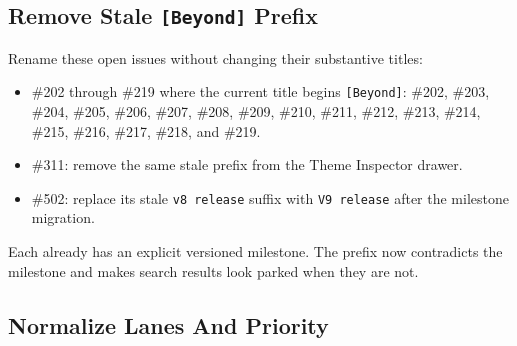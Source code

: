 \subsection{\texorpdfstring{Remove Stale \texttt{[\allowbreak{}B\allowbreak{}e\allowbreak{}y\allowbreak{}o\allowbreak{}n\allowbreak{}d\allowbreak{}]} Prefix}{Remove Stale  Prefix}}\label{record-249-remove-stale-beyond-prefix}

Rename these open issues without changing their substantive titles:

\begin{itemize}
\tightlist
\item
  \#202 through \#219 where the current title begins \texttt{[\allowbreak{}B\allowbreak{}e\allowbreak{}y\allowbreak{}o\allowbreak{}n\allowbreak{}d\allowbreak{}]}: \#202, \#203, \#204, \#205, \#206, \#207, \#208, \#209, \#210, \#211, \#212, \#213, \#214, \#215, \#216, \#217, \#218, and \#219.
\item
  \#311: remove the same stale prefix from the Theme Inspector drawer.
\item
  \#502: replace its stale \texttt{v\allowbreak{}8\allowbreak{} \allowbreak{}r\allowbreak{}e\allowbreak{}l\allowbreak{}e\allowbreak{}a\allowbreak{}s\allowbreak{}e} suffix with \texttt{V\allowbreak{}9\allowbreak{} \allowbreak{}r\allowbreak{}e\allowbreak{}l\allowbreak{}e\allowbreak{}a\allowbreak{}s\allowbreak{}e} after the milestone migration.
\end{itemize}

Each already has an explicit versioned milestone. The prefix now contradicts the milestone and makes search results look parked when they are not.

\subsection{Normalize Lanes And Priority}\label{record-249-normalize-lanes-and-priority}

